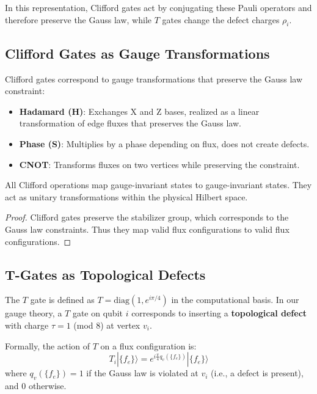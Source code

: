 In this representation, Clifford gates act by conjugating these Pauli operators and therefore preserve the Gauss law, while $T$ gates change the defect charges $\rho_i$.

\subsection{Clifford Gates as Gauge Transformations}

Clifford gates correspond to gauge transformations that preserve the Gauss law constraint:

\begin{itemize}
    \item \textbf{Hadamard (H)}: Exchanges X and Z bases, realized as a linear transformation of edge fluxes that preserves the Gauss law.
    \item \textbf{Phase (S)}: Multiplies by a phase depending on flux, does not create defects.
    \item \textbf{CNOT}: Transforms fluxes on two vertices while preserving the constraint.
\end{itemize}

\begin{lemma}
All Clifford operations map gauge-invariant states to gauge-invariant states. They act as unitary transformations within the physical Hilbert space.
\end{lemma}

\begin{proof}
Clifford gates preserve the stabilizer group, which corresponds to the Gauss law constraints. Thus they map valid flux configurations to valid flux configurations.
\end{proof}

\subsection{T-Gates as Topological Defects}

The $T$ gate is defined as $T = \text{diag}(1, e^{i\pi/4})$ in the computational basis. In our gauge theory, a $T$ gate on qubit $i$ corresponds to inserting a \textbf{topological defect} with charge $\tau = 1$ (mod 8) at vertex $v_i$.

Formally, the action of $T$ on a flux configuration is:
\begin{equation}
T_i | \{f_e\} \rangle = e^{i \frac{\pi}{4} q_v(\{f_e\})} | \{f_e\} \rangle
\end{equation}
where $q_v(\{f_e\}) = 1$ if the Gauss law is violated at $v_i$ (i.e., a defect is present), and $0$ otherwise.

